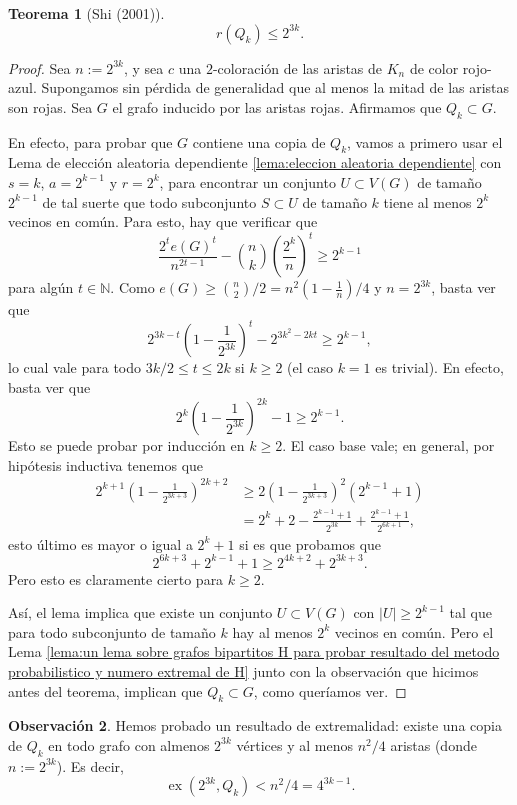 \documentclass[12pt]{report}
\theoremstyle{plain}
\newtheorem{theorem}{Teorema}[section]
\theoremstyle{definition}
\newtheorem{obs}[theorem]{Observación}
\newcommand{\naturals}{\mathbb{N}}
\newcommand{\abs}[1]{\left \vert #1 \right \vert}
\newcommand{\ex}[2]{\operatorname{ex} (#1, #2)}
\begin{document}
\begin{theorem}[Shi (2001)]
    \[
    r(Q_k) \leq 2^{3k}.
    \]
\end{theorem}
\begin{proof}
Sea $n := 2^{3k}$, y sea $c$ una $2$-coloración de las aristas de $K_n$ de color rojo-azul. Supongamos sin pérdida de generalidad que al menos la mitad de las aristas son rojas. Sea $G$ el grafo inducido por las aristas rojas. Afirmamos que $Q_k \subset G$.

En efecto, para probar que $G$ contiene una copia de $Q_k$, vamos a primero usar el Lema de elección aleatoria dependiente \ref{lema:eleccion aleatoria dependiente} con $s = k$, $a = 2^{k-1}$ y $r = 2^k$, para encontrar un conjunto $U \subset V(G)$ de tamaño $2^{k-1}$ de tal suerte que todo subconjunto $S \subset U$ de tamaño $k$ tiene al menos $2^k$ vecinos en común. Para esto, hay que verificar que
\[
    \frac{2^t e(G)^t}{n^{2t-1}} - \binom n k \left ( \frac{2^k}{n} \right )^t \geq 2^{k-1}
\]
para algún $t \in \naturals$. Como  $e(G) \geq \binom n 2 / 2 = n^2(1-\frac 1 n)/4$ y $n = 2^{3k}$, basta ver que
\[
2^{3k-t}(1- \frac{1}{2^{3k}})^t - 2^{3k^2 - 2k t} \geq 2^{k-1},
\]
lo cual vale para todo $3 k /2 \leq t \leq 2k$ si $k \geq 2$ (el caso $k = 1$ es trivial). En efecto, basta ver que
\[
    2^k (1- \frac 1 {2^{3k}})^{2k} - 1 \geq 2^{k-1}.
\]
Esto se puede probar por inducción en $k \geq 2$. El caso base vale; en general, por hipótesis inductiva tenemos que
\begin{align*}
2^{k+1} (1- \frac {1}{2^{3k + 3}})^{2k + 2} &\geq 2 (1- \frac{1}{2^{3k+3}})^2 (2^{k-1} + 1) \\
&= 2^k + 2 - \frac{2^{k-1}+ 1}{2^{3k}} + \frac{2^{k-1} + 1}{2^{6k + 1}},
\end{align*}
esto último es mayor o igual a $2^k + 1$ si es que probamos que
\[
    2^{6k + 3} + 2^{k-1} + 1 \geq 2^{4k + 2} + 2^{3k + 3}.
\]
Pero esto es claramente cierto para $k \geq 2$.

Así, el lema implica que existe un conjunto $U \subset V(G)$ con $\abs U \geq 2^{k-1} $ tal que para todo subconjunto de tamaño $k$ hay al menos $2^k$ vecinos en común. Pero el Lema \ref{lema:un lema sobre grafos bipartitos H para probar resultado del metodo probabilistico y numero extremal de H} junto con la observación que hicimos antes del teorema, implican que $Q_k \subset G$, como queríamos ver.
\end{proof}

\begin{obs}
Hemos probado un resultado de extremalidad: existe una copia de $Q_k$ en todo grafo con almenos $2^{3k}$ vértices y al menos $n^2/4$ aristas (donde $n := 2^{3k}$). Es decir,
\[
    \ex {2^{3k}}{Q_k} < n^2 / 4 = 4^{3k-1}.
\]
\end{obs}
\end{document}
